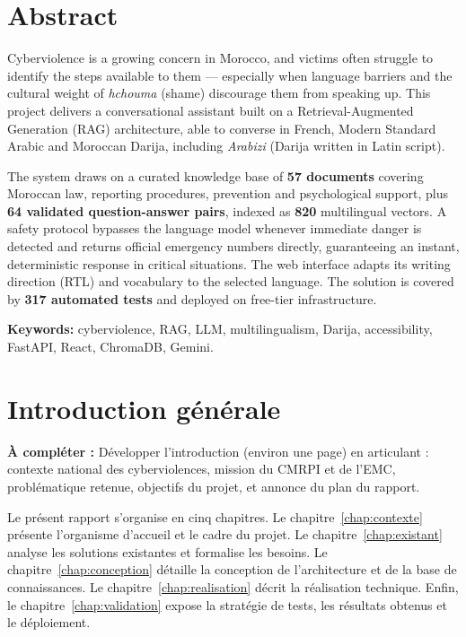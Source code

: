 \documentclass[a4paper,11pt,twoside]{report}
\newcommand{\todo}[1]{%
  \begin{tcolorbox}[colback=yellow!12,colframe=orange!70!black,left=4pt,right=4pt,top=3pt,bottom=3pt]
  \small\textbf{À compléter :} #1
  \end{tcolorbox}}
\begin{document}
\chapter*{Abstract}

Cyberviolence is a growing concern in Morocco, and victims often struggle to
identify the steps available to them --- especially when language barriers and
the cultural weight of \emph{hchouma} (shame) discourage them from speaking up.
This project delivers a conversational assistant built on a
Retrieval-Augmented Generation (RAG) architecture, able to converse in French,
Modern Standard Arabic and Moroccan Darija, including \emph{Arabizi} (Darija
written in Latin script).

The system draws on a curated knowledge base of \textbf{57 documents} covering
Moroccan law, reporting procedures, prevention and psychological support, plus
\textbf{64 validated question-answer pairs}, indexed as \textbf{820}
multilingual vectors. A safety protocol bypasses the language model whenever
immediate danger is detected and returns official emergency numbers directly,
guaranteeing an instant, deterministic response in critical situations. The web
interface adapts its writing direction (RTL) and vocabulary to the selected
language. The solution is covered by \textbf{317 automated tests} and deployed
on free-tier infrastructure.

\vspace{0.4cm}
\noindent\textbf{Keywords:} cyberviolence, RAG, LLM, multilingualism, Darija,
accessibility, FastAPI, React, ChromaDB, Gemini.

\tableofcontents
\listoffigures
\listoftables

\chapter*{Introduction générale}

\todo{Développer l'introduction (environ une page) en articulant :
contexte national des cyberviolences, mission du CMRPI et de l'EMC,
problématique retenue, objectifs du projet, et annonce du plan du rapport.}

Le présent rapport s'organise en cinq chapitres. Le
chapitre~\ref{chap:contexte} présente l'organisme d'accueil et le cadre du
projet. Le chapitre~\ref{chap:existant} analyse les solutions existantes et
formalise les besoins. Le chapitre~\ref{chap:conception} détaille la conception
de l'architecture et de la base de connaissances. Le
chapitre~\ref{chap:realisation} décrit la réalisation technique. Enfin, le
chapitre~\ref{chap:validation} expose la stratégie de tests, les résultats
obtenus et le déploiement.
\end{document}
